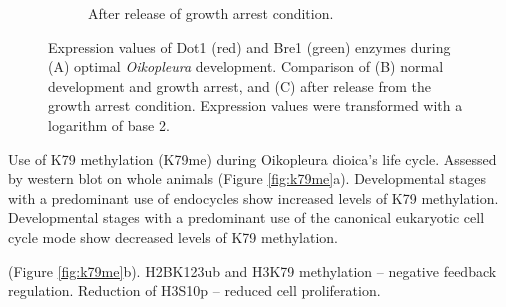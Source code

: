 \documentclass[11pt,twoside,a4paper]{report}
\begin{document}
\begin{figure}
\begin{subfigure}{.5\textwidth}
			\caption{After release of growth arrest condition.}
		\end{subfigure}		
		\caption{Expression values of Dot1 (red) and Bre1 (green) enzymes during (A) optimal \textit{Oikopleura} development. Comparison of (B) normal development and growth arrest, and (C) after release from the growth arrest condition.
		{\footnotesize
			Expression values were transformed with a logarithm of base 2.
			}
		}		
		\label{fig:Dot1_Bre1_expression}
	\end{figure}
		
	
	Use of K79 methylation (K79me) during Oikopleura dioica's life cycle.
	Assessed by western blot on whole animals (Figure \ref{fig:k79me}a).
	Developmental stages with a predominant use of endocycles show increased levels of K79 methylation.
	Developmental stages with a predominant use of the canonical eukaryotic cell cycle mode show decreased levels of K79 methylation.
	
	(Figure \ref{fig:k79me}b).	
	H2BK123ub and H3K79 methylation – negative feedback regulation.
	Reduction of H3S10p – reduced cell proliferation.
	
\end{document}
